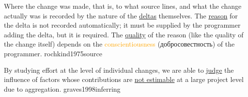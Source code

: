 \documentclass{article}
\begin{document}


  {Where the change was made, that is, to what source lines, and what the change actually was is recorded by the nature of the \ul{deltas} themselves. The \ul{reason} for the delta is not recorded automatically; it must be supplied by the programmer adding the delta, but it is required. The \ul{quality} of the reason (like the quality of the change itself) depends on the \textcolor{orange}{conscientiousness} ({добросовестность}) of the programmer.}
  {rochkind1975source}


  {By studying effort at the level of individual changes, we are able to \ul{judge} the influence of factors whose contributions are \ul{not estimable} at a large project level due to aggregation.}
  {graves1998inferring}
\end{document}
